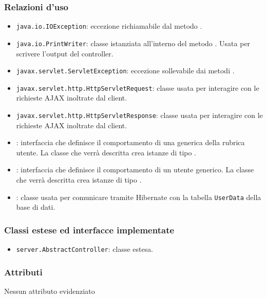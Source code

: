 \subsubsection*{Relazioni d'uso}

\begin{itemize}
	\item \texttt{java.io.IOException}: eccezione richiamabile dal metodo .
	\item \texttt{java.io.PrintWriter}: classe istanziata all'interno del metodo . Usata per scrivere l'output del controller.
	\item \texttt{javax.servlet.ServletException}: eccezione sollevabile dai metodi .
	\item \texttt{javax.servlet.http.HttpServletRequest}: classe usata per interagire con le richieste AJAX inoltrate dal client.
	\item \texttt{javax.servlet.http.HttpServletResponse}: classe usata per interagire con le richieste AJAX inoltrate dal client.
	\item {}: interfaccia che definisce il comportamento di una generica  della rubrica utente. La classe che verrà descritta crea istanze di tipo .
	\item {}: interfaccia che definisce il comportamento di un utente generico. La classe che verrà descritta crea istanze di tipo .
	\item {}: classe usata per comunicare tramite Hibernate con la tabella \texttt{UserData} della base di dati.
\end{itemize}

\subsubsection*{Classi estese ed interfacce implementate}
\begin{itemize}
	\item \texttt{server.AbstractController}: classe estesa.
\end{itemize}

\subsubsection*{Attributi}

Nessun attributo evidenziato

